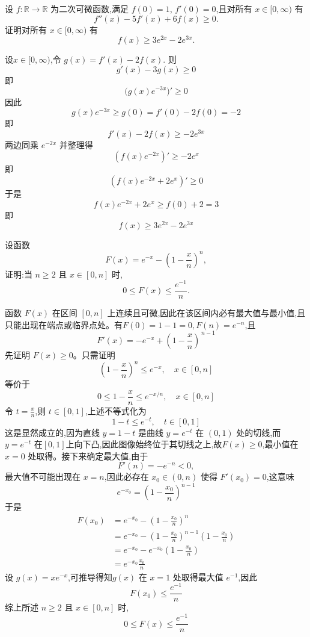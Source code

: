 \begin{questions}
    \question 设 $f: \mathbb{R} \to \mathbb{R}$ 为二次可微函数,满足 $f(0)=1$, $f'(0)=0$,且对所有 $x \in [0,\infty)$ 有
    \[
    f''(x)-5f'(x)+6f(x)\ge0.
    \]
    证明对所有 $x \in [0,\infty)$ 有
    \[
    f(x) \ge 3 e^{2x} - 2 e^{3x}.
    \]
    \begin{solution}
        设$x \in [0,\infty)$,令 $g(x) = f'(x) - 2f(x)$. 则
        \[
        g'(x) - 3 g(x) \ge 0
        \]
        即
        \[
        \bigl(g(x) e^{-3x}\bigr)' \ge 0
        \]
        因此
        \[
        g(x)e^{-3x} \ge g(0) = f'(0) - 2 f(0) = -2
        \]
        即
        \[
        f'(x) - 2f(x) \ge -2 e^{3x}
        \]
        两边同乘 $e^{-2x}$ 并整理得
        \[
        (f(x)e^{-2x})' \ge -2 e^{x}
        \]
        即
        \[
        (f(x)e^{-2x} + 2 e^x)' \ge 0
        \]
        于是
        \[
        f(x)e^{-2x} + 2 e^x \ge f(0) + 2 = 3
        \]
        即
        \[
        f(x) \ge 3 e^{2x} - 2 e^{3x}
        \]
    \end{solution}

    \question 设函数
    \[
    F(x) = e^{-x} - \left(1-\frac{x}{n}\right)^n,
    \]
    证明:当 $n \ge 2$ 且 $x \in [0,n]$ 时,
    \[
    0 \le F(x) \le \frac{e^{-1}}{n}.
    \]
    \begin{solution}
        函数 $F(x)$ 在区间 $[0,n]$ 上连续且可微,因此在该区间内必有最大值与最小值,且只能出现在端点或临界点处。有$F(0) = 1-1 = 0,F(n) = e^{-n}$,且
        \[
        F'(x) = -e^{-x} + \left(1-\frac{x}{n}\right)^{\,n-1}
        \]
        先证明 $F(x) \ge 0$。只需证明
        \[
        \left(1-\frac{x}{n}\right)^n \le e^{-x}, \quad x \in [0,n]
        \]
        等价于
        \[
        0 \le 1-\frac{x}{n} \le e^{-x/n}, \quad x \in [0,n]
        \]
        令 $t=\frac{x}{n}$,则 $t \in [0,1]$,上述不等式化为
        \[
        1-t \le e^{-t}, \quad t \in [0,1]
        \]
        这是显然成立的,因为直线 $y=1-t$ 是曲线 $y=e^{-t}$ 在 $(0,1)$ 处的切线,而 $y=e^{-t}$ 在$[0,1]$上向下凸,因此图像始终位于其切线之上,故$F(x) \ge 0$,最小值在 $x=0$ 处取得。接下来确定最大值,由于
        \[
        F'(n) = -e^{-n} < 0,
        \]
        最大值不可能出现在 $x=n$,因此必存在 $x_0 \in (0,n)$ 使得
        $F'(x_0)=0$,这意味
        \[
        e^{-x_0} = \left(1-\frac{x_0}{n}\right)^{n-1}
        \]
        于是
        \begin{align*}
        F(x_0)
        &= e^{-x_0}-\left(1-\frac{x_0}{n}\right)^n \\
        &= e^{-x_0}-\left(1-\frac{x_0}{n}\right)^{n-1}\left(1-\frac{x_0}{n}\right) \\
        &= e^{-x_0}-e^{-x_0}\left(1-\frac{x_0}{n}\right) \\
        &= e^{-x_0}\frac{x_0}{n}
        \end{align*}
        设 $g(x)=x e^{-x}$,可推导得知$g(x)$ 在 $x=1$ 处取得最大值 $e^{-1}$,因此
        \[
        F(x_0) \le \frac{e^{-1}}{n}
        \]
        综上所述 $n\ge 2$ 且 $x \in [0,n]$ 时,
        \[
        0 \le F(x) \le \frac{e^{-1}}{n}
        \]
    \end{solution}


\end{questions}
